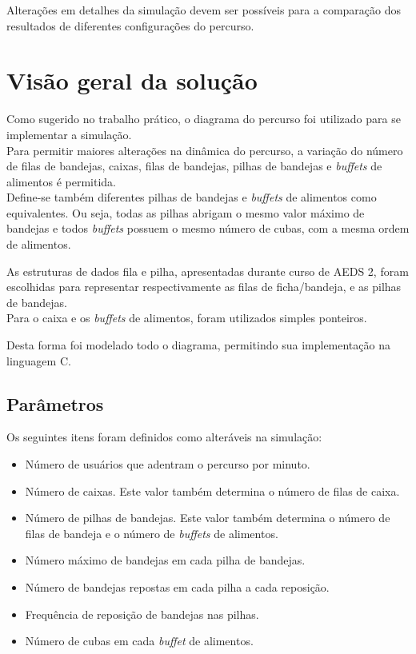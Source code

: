 \documentclass{article}
\begin{document}
Alterações em detalhes da simulação devem ser possíveis para a comparação dos resultados de diferentes configurações do percurso.


\section{Visão geral da solução}
Como sugerido no trabalho prático, o diagrama do percurso foi utilizado para se implementar a simulação.\\
Para permitir maiores alterações na dinâmica do percurso, a variação do número de filas de bandejas, caixas, filas de bandejas, pilhas de bandejas e \textit{buffets} de alimentos é permitida.\\
Define-se também diferentes pilhas de bandejas e \textit{buffets} de alimentos como equivalentes. Ou seja, todas as pilhas abrigam o mesmo valor máximo de bandejas e todos \textit{buffets} possuem o mesmo número de cubas, com a mesma ordem de alimentos.

As estruturas de dados fila e pilha, apresentadas durante curso de AEDS 2, foram escolhidas para representar respectivamente as filas de ficha/bandeja, e as pilhas de bandejas.\\
Para o caixa e os \textit{buffets} de alimentos, foram utilizados simples ponteiros.

Desta forma foi modelado todo o diagrama, permitindo sua implementação na linguagem C.

\subsection{Parâmetros}
\label{ssec:params}
Os seguintes itens foram definidos como alteráveis na simulação:
\begin{itemize}
  \setlength\itemsep{3px}
  \item Número de usuários que adentram o percurso por minuto.
  \item Número de caixas. Este valor também determina o número de filas de caixa.
  \item Número de pilhas de bandejas. Este valor também determina o número de filas de bandeja e o número de \textit{buffets} de alimentos.
  \item Número máximo de bandejas em cada pilha de bandejas.
  \item Número de bandejas repostas em cada pilha a cada reposição.
  \item Frequência de reposição de bandejas nas pilhas.
  \item Número de cubas em cada \textit{buffet} de alimentos.
\end{itemize}
\end{document}
